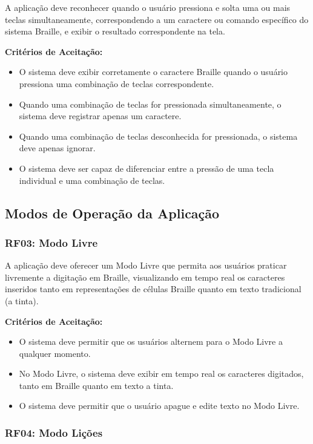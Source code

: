 A aplicação deve reconhecer quando o usuário pressiona e solta uma ou mais teclas simultaneamente, correspondendo a um caractere ou comando específico do sistema Braille, e exibir o resultado correspondente na tela.

\textbf{Critérios de Aceitação:}
\begin{itemize}
    \item O sistema deve exibir corretamente o caractere Braille quando o usuário pressiona uma combinação de teclas correspondente.
    \item Quando uma combinação de teclas for pressionada simultaneamente, o sistema deve registrar apenas um caractere.
    \item Quando uma combinação de teclas desconhecida for pressionada, o sistema deve apenas ignorar.
    \item O sistema deve ser capaz de diferenciar entre a pressão de uma tecla individual e uma combinação de teclas.
\end{itemize}

\subsection{Modos de Operação da Aplicação}

\subsubsection{\gls{RF}03: Modo Livre}

A aplicação deve oferecer um Modo Livre que permita aos usuários praticar livremente a digitação em Braille, visualizando em tempo real os caracteres inseridos tanto em representações de células Braille quanto em texto tradicional (a tinta).

\textbf{Critérios de Aceitação:}
\begin{itemize}
    \item O sistema deve permitir que os usuários alternem para o Modo Livre a qualquer momento.
    \item No Modo Livre, o sistema deve exibir em tempo real os caracteres digitados, tanto em Braille quanto em texto a tinta.
    \item O sistema deve permitir que o usuário apague e edite texto no Modo Livre.
\end{itemize}

\subsubsection{\gls{RF}04: Modo Lições}

